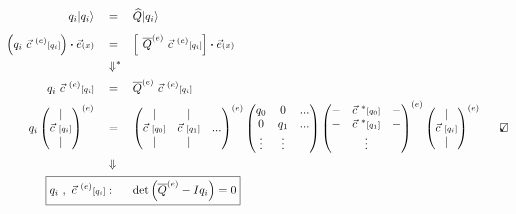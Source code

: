 \documentclass[12pt]{article}
\newcommand{\checkedbox}{\mbox{\ooalign{$\checkmark$\cr\hidewidth$\square$\hidewidth\cr}}} %
\newcommand*{\dotP}{\boldsymbol \cdot}	%
\begin{document}
\noindent
\begin{minipage}[t]{.55\textwidth}
    \setlength{\parindent}{.5cm}
    \indent \(\begin{aligned}[t]
        q_i | q_i \rangle \quad &= \quad \widehat{Q} | q_i \rangle\\[5pt]
        \left( q_i \ \vec{c}^{\ (e)}{\scriptstyle[q_i]} \right) \dotP \vec{e}{\scriptstyle(x)} 
            \quad &= \quad 
            \left[^{\ } \overline{Q}^{(e)} \ \vec{c}^{\ (e)}{\scriptstyle[q_i]} \right] 
            \dotP \vec{e}{\scriptstyle(x)}\\
        &\Downarrow^*\\ %
        q_i \ \vec{c}^{\ (e)}{\scriptstyle[q_i]} 
            \quad &= \quad \overline{Q}^{(e)} \ \vec{c}^{\ (e)}{\scriptstyle[q_i]} \\
        q_i \left(\begin{matrix} 
                |\\
                \vec{c}\ {\scriptstyle[q_i]}\\
                |
            \end{matrix}\right)^{(e)}
            \quad &= \quad 
            \left(\begin{matrix} 
                |   & |   &    \\
                \vec{c}\ {\scriptstyle[q_0]} & \vec{c}\ {\scriptstyle[q_1]} & ... \\
                |   & |   & 
            \end{matrix}\right)^{(e)}
            \left(\begin{matrix} 
                q_0   & 0         & ...\\
                0           & q_1 & ...\\
                \vdots      & \vdots    & 
            \end{matrix}\right)
            \left(\begin{matrix} 
                - & \vec{c}^{\ *}{\scriptstyle[q_0]} & - \\
                - & \vec{c}^{\ *}{\scriptstyle[q_1]} & - \\
                & \vdots  &  \\
            \end{matrix}\right)^{(e)}
            \left(\begin{matrix} 
                |\\
                \vec{c}\ {\scriptstyle[q_i]}\\
                |
            \end{matrix}\right)^{(e)} \indent \checkedbox\\
        &\Downarrow\\
        \Aboxed{ q_i\ ,\ \vec{c}^{\ (e)}{\scriptstyle[q_i]} &: 
            \indent \text{det} \left( \overline{Q}^{(e)} - I q_i \right) = 0 } 
    \end{aligned}\)
\end{minipage}
\end{document}
